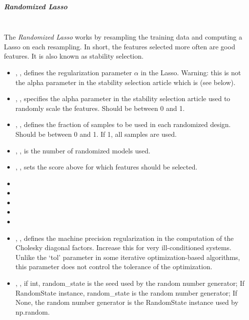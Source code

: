 \subparagraph{Randomized Lasso}
\mbox{}
\\The \textit{Randomized Lasso} works by resampling the training data and
computing a Lasso on each resampling.
%
In short, the features selected more often are good features.
%
It is also known as stability selection.
%
\begin{itemize}
  \item {}, , defines the
  regularization parameter $\alpha$ in the Lasso.
  Warning: this is not the alpha parameter in the stability selection article
  which is  (see below). 
  \item {}, , specifies the alpha
  parameter in the stability selection article used to randomly scale the
  features. 
  Should be between 0 and 1.
  \item {}, , defines
  the fraction of samples to be used in each randomized design.
  Should be between 0 and 1.
  If 1, all samples are used.
  \item {}, , is the number of
  randomized models used.
  \item {}, , sets
  the score above for which features should be selected.
  \item {}
  \item \verDescriptionB
  \item {}
  \item \precomputeDescription{}
  \item \maxIterDescription{}
  \item {}, , defines the machine
  precision regularization in the computation of the Cholesky diagonal factors.
  Increase this for very ill-conditioned systems.
  Unlike the `tol' parameter in some iterative optimization-based algorithms,
  this parameter does not control the tolerance of the optimization.
  \item {}, , if int, random\_state is the seed used by the random number
  generator; If RandomState instance, random\_state is the random
  number generator; If None, the random number generator is the RandomState
  instance used by np.random.
\end{itemize}

